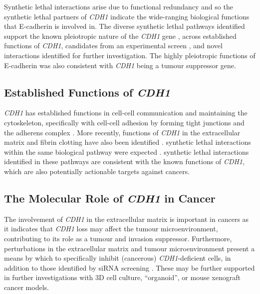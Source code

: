 Synthetic lethal interactions arise due to \gls{functional redundancy} \citep{Boone2007, Kaelin2005, Fece2015} and so the \gls{synthetic lethal} partners of \textit{CDH1} indicate the wide-ranging biological functions that \gls{E-cadherin} is involved in. The diverse \gls{synthetic lethal} pathways identified support the known pleiotropic nature of the \textit{CDH1} gene \citep{Kroepil2012}, across established functions of \textit{CDH1}, candidates from an experimental screen \citep{Telford2015}, and novel interactions identified for further investigation. The highly pleiotropic functions of \gls{E-cadherin} was also consistent with \textit{CDH1} being a \gls{tumour suppressor} gene. %

\subsection{Established Functions of \textit{CDH1}}
\label{chapt6:function}

\textit{CDH1} has established functions in cell-cell communication and maintaining the cytoskeleton, specifically with cell-cell adhesion by forming tight junctions and the adherens complex \citep{Jeanes2008}. More recently, functions of \textit{CDH1} in the extracellular matrix and fibrin clotting have also been identified \citep{Tunggal2005, Cardiff2011, Wojtukiewicz2016}. \Gls{synthetic lethal} interactions within the same biological pathway were expected \citep{Kelley2005, Boone2007}. \Gls{synthetic lethal} interactions identified in these pathways are consistent with the known functions of \textit{CDH1}, which are also potentially actionable targets against cancers.


\subsection{The Molecular Role of \textit{CDH1} in Cancer}
\label{chapt6:cancer}

The involvement of \textit{CDH1} in the extracellular matrix is important in cancers as it indicates that \textit{CDH1} loss may affect the tumour microenvironment, contributing to its role as a tumour and invasion suppressor. Furthermore, perturbations in the extracellular matrix and tumour microenvironment present a means by which to specifically inhibit (cancerous) \textit{CDH1}-deficient cells, in addition to those identified by \gls{siRNA} screening \citep{Telford2015}. 
These may be further supported in further investigations with 3D cell culture, ``organoid'', or mouse xenograft cancer models.

